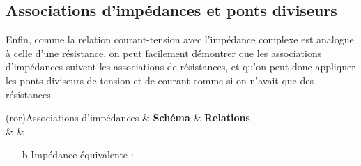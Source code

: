 \documentclass[../../main/main.tex]{subfiles}
\begin{document}
\subsection{Associations d'impédances et ponts diviseurs}
Enfin, comme la relation courant-tension avec l'impédance complexe est analogue
à celle d'une résistance, on peut facilement démontrer que les associations
d'impédances suivent les associations de résistances, et qu'on peut donc
appliquer les ponts diviseurs de tension et de courant comme si on n'avait que
des résistances.
\begin{tcb}[tabularx={l|Y|Y}](ror){Associations d'impédances}
	&
	\vspace{8pt}
	\textbf{Schéma} &
	\textbf{Relations}
	\\\hline
	 &
	\vspace{-15pt}
	&
	\begin{itemize}
		\item[b]{Impédance équivalente} :

\end{itemize}
\end{tcb}
\end{document}
